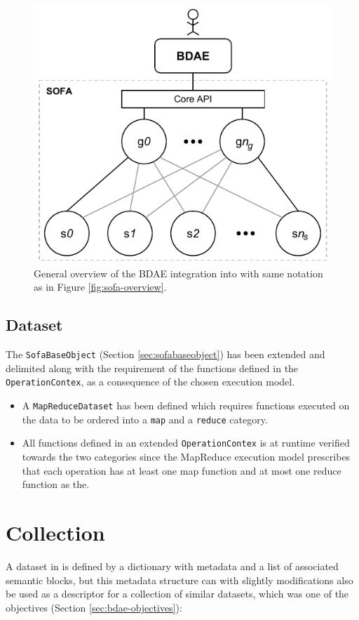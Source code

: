\begin{figure}
	\centering
	\includegraphics[scale=0.9]{pdf/bdae-overview.pdf}
	\caption[General overview of the BDAE]{General overview of the BDAE integration into \CodeName with same notation as in Figure \ref{fig:sofa-overview}. \label{fig:bdae-overview}}
\end{figure}	


\subsection{Dataset}
The \texttt{SofaBaseObject} (Section \ref{sec:sofabaseobject}) has been extended and delimited along with the requirement of the functions defined in the \texttt{OperationContex}, as a consequence of the chosen execution model. 
\begin{itemize}
	\item A \texttt{MapReduceDataset} has been defined which requires functions executed on the data to be ordered into a \texttt{map} and a \texttt{reduce} category. 
	\item All functions defined in an extended \texttt{OperationContex} is at runtime verified towards the two categories since the MapReduce execution model prescribes that each operation has at least one map function and at most one reduce function as the.
\end{itemize}

\section{Collection} \label{sec:collection}
A dataset in \CodeName is defined by a dictionary with metadata and a list of associated semantic blocks, but this metadata structure can with slightly modifications also be used as a descriptor for a collection of similar datasets, which was one of the objectives (Section \ref{sec:bdae-objectives}):

